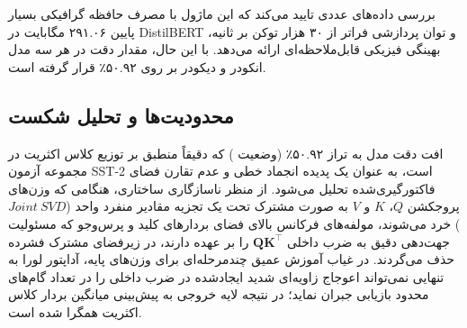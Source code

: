 بررسی داده‌های عددی تایید می‌کند که این ماژول با مصرف حافظه گرافیکی بسیار پایین ۲۹۱.۰۶ مگابایت در DistilBERT و توان پردازشی فراتر از ۳۰ هزار توکن بر ثانیه، بهینگی فیزیکی قابل‌ملاحظه‌ای ارائه می‌دهد. با این حال، مقدار دقت در هر سه مدل انکودر و دیکودر بر روی ۵۰.۹۲٪ قرار گرفته است.

\subsection{محدودیت‌ها و تحلیل شکست}
افت دقت مدل به تراز ۵۰.۹۲٪ (وضعیت ) که دقیقاً منطبق بر توزیع کلاس اکثریت در مجموعه آزمون SST-2 است، به عنوان یک پدیده انجماد خطی و عدم تقارن فضای فاکتورگیری‌شده تحلیل می‌شود. از منظر ناسازگاری ساختاری، هنگامی که وزن‌های پروجکشن $Q$، $K$ و $V$ به صورت مشترک تحت یک تجزیه مقادیر منفرد واحد ($Joint\ SVD$) خرد می‌شوند، مولفه‌های فرکانس بالای فضای بردارهای کلید و پرس‌وجو که مسئولیت جهت‌دهی دقیق به ضرب داخلی $\mathbf{Q}\mathbf{K}^\top$ را بر عهده دارند، در زیرفضای مشترک فشرده حذف می‌گردند. در غیاب آموزش عمیق چندمرحله‌ای برای وزن‌های پایه، آداپتور لورا به تنهایی نمی‌تواند اعوجاج زاویه‌ای شدید ایجادشده در ضرب داخلی را در تعداد گام‌های محدود بازیابی جبران نماید؛ در نتیجه لایه خروجی به پیش‌بینی میانگین بردار کلاس اکثریت همگرا شده است.
